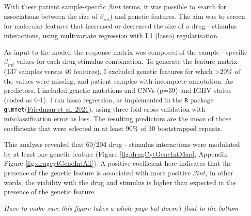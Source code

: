 \documentclass[11pt, a4paper, twosided]{book}
\begin{document}
With these patient sample-specific \(\beta{int}\) terms, it was possible to search for associations between the size of \(\beta_{int}\)) and genetic features. The aim was to screen for molecular features that increased or decreased the size of a drug - stimulus interactions, using multivariate regression with L1 (lasso) regularisation.

As input to the model, the response matrix was composed of the sample - specific \(\beta_{int}\) values for each drug-stimulus combination. To generate the feature matrix (137 samples versus 40 features), I excluded genetic features for which \textgreater20\% of the values were missing, and patient samples with incomplete annotation. As predictors, I included genetic mutations and CNVs (p=39) and IGHV status (coded as 0-1). I ran lasso regression, as implemented in the \texttt{R} package \texttt{glmnet}(\protect\hyperlink{ref-R-glmnet}{Friedman et al. 2021}), using three-fold cross-validation with misclassification error as loss. The resulting predictors are the mean of those coefficients that were selected in at least 90\% of 30 bootstrapped repeats.

This analysis revealed that 60/204 drug - stimulus interactions were modulated by at least one genetic feature (Figure \ref{fig:drugCytGeneIntMap}, Appendix Figure \ref{fig:drugcytGeneIntAll}). A positive coefficient here indicates that the presence of the genetic feature is associated with more positive \(\beta{int}\), in other words, the viability with the drug and stimulus is higher than expected in the presence of the genetic feature.

\emph{Have to make sure this figure takes a whole page but doesn't float to the bottom}
\end{document}
